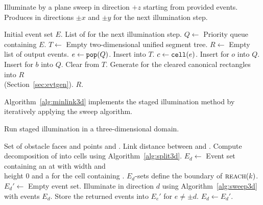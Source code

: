 \documentclass[english,gradu]{tktltiki2018}
\begin{document}
\begin{algorithm}
\caption{Illuminate by a plane sweep in direction $+z$ starting from provided events.
	Produces \addEs in directions $\pm x$ and $\pm y$ for the next illumination step.}\label{alg:sweep3d}
\begin{algorithmic}
\Require Initial event set $E$.
\Output List of \addEs for the next illumination step.
\State $Q\gets$ Priority queue containing $E$.
\State $T\gets$ Empty two-dimensional unified segment tree.
\State $R\gets$ Empty list of output events.
	\State $e\gets\texttt{pop}(Q)$.
		\State Insert  into $T$.
			\State $c\gets\mathtt{cell}(e)$.
				\State Insert \obsE for $o$ into $Q$.
			\EndFor
				\State Insert \cellE for $b$ into $Q$.
			\EndFor
		\EndIf
		\State Clear  from $T$.
		\State Generate \addEs for the cleared canonical rectangles into $R$ \\
			\hspace{20mm} (Section~\ref{sec:evtgen}).
	\EndIf
\EndWhile
\State \Return $R$.
\end{algorithmic}
\end{algorithm}

Algorithm~\ref{alg:minlink3d} implements the staged illumination method by iteratively applying the sweep algorithm.

\begin{algorithm}
\caption{Run staged illumination in a three-dimensional domain.}\label{alg:minlink3d}
\begin{algorithmic}
\Require Set of obstacle faces and points \spt and \ept.
\Output Link distance between \spt and \ept.
\State Compute decomposition of \fspace into cells using Algorithm~\ref{alg:split3d}.
	\State $E_d\gets$ Event set containing an \addE at \spt with width and \\
		\hspace{16.5mm} height 0 and a \cellE for the cell containing \spt.
\EndFor
{}
	\State \LComment $E_d$-sets define the boundary of $\textsc{reach}(k)$.
		\State $E_d'\gets$ Empty event set.
	\EndFor
		\State Illuminate in direction $d$ using Algorithm~\ref{alg:sweep3d} with events $E_d$.
		\State Store the returned events into $E_e'$ for $e\neq\pm d$.
	\EndFor
		\State $E_d\gets E_d'$.
	\EndFor
\EndWhile
\end{algorithmic}
\end{algorithm}
\end{document}
